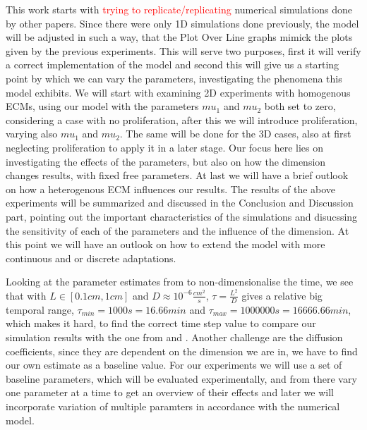 This work starts with \textcolor{red}{trying to replicate/replicating} numerical simulations done by other papers. Since there were only 1D simulations done previously, the model will be adjusted in such a way, that the Plot Over Line graphs mimick the plots given by the previous experiments. This will serve two purposes, first it will verify a correct implementation of the model and second this will give us a starting point by which we can vary the parameters, investigating the phenomena this model exhibits. \newline 
We will start with examining 2D experiments with homogenous ECMs, using our model with the parameters $mu_1$ and $mu_2$ both set to zero, considering a case with no proliferation, after this we will introduce proliferation, varying also $mu_1$ and $mu_2$. The same will be done for the 3D cases, also at first neglecting proliferation to apply it in a later stage. Our focus here lies on investigating the effects of the parameters, but also on how the dimension changes results, with fixed free parameters. At last we will have a brief outlook on how a heterogenous ECM influences our results.\newline
The results of the above experiments will be summarized and discussed in the Conclusion and Discussion part, pointing out the important characteristics of the simulations and disucssing the sensitivity of each of the parameters and the influence of the dimension. At this point we will have an outlook on how to extend the model with more continuous and or discrete adaptations. \newline \newline

Looking at the parameter estimates from \cite{anderson_mathematical_2000} to non-dimensionalise the time, we see that with $L \in [0.1cm,1cm]$ and $D\approx 10^{-6}\frac{cm^2}{s}$, $\tau = \frac{L^2}{D}$ gives a relative big temporal range, $\tau_{min} = 1000s = 16.66 min$ and $\tau_{max} = 1000000s = 16666.66min$, which makes it hard, to find the correct time step value to compare our simulation results with the one from \cite{anderson_mathematical_2000} and \cite{Kolev2010}. Another challenge are the diffusion coefficients, since they are dependent on the dimension we are in, we have to find our own estimate as a baseline value. \newline 
For our experiments we will use a set of baseline parameters, which will be evaluated experimentally, and from there vary one parameter at a time to get an overview of their effects and later we will incorporate variation of multiple paramters in accordance with the numerical model. 


